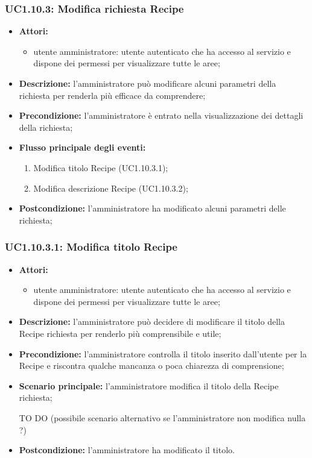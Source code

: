 \subsubsection{UC1.10.3: Modifica richiesta Recipe}
	\begin{itemize}
		\item \textbf{Attori:}
		\begin{itemize}
			\item utente amministratore: utente autenticato che ha accesso al servizio e dispone dei permessi per visualizzare tutte le aree;
		\end{itemize}
		\item \textbf{Descrizione:} l'amministratore può modificare alcuni parametri della richiesta per renderla più efficace da comprendere;
		\item \textbf{Precondizione:} l'amministratore è entrato nella visualizzazione dei dettagli della richiesta;
		\item \textbf{Flusso principale degli eventi:}
		\begin{enumerate}
			\item Modifica titolo Recipe (UC1.10.3.1);
			\item Modifica descrizione Recipe (UC1.10.3.2);
		\end{enumerate}
		\item \textbf{Postcondizione:} l'amministratore ha modificato alcuni parametri delle richiesta;
	\end{itemize}

\subsubsection{UC1.10.3.1: Modifica titolo Recipe}
	\begin{itemize}
		\item \textbf{Attori:}
		\begin{itemize}
			\item utente amministratore: utente autenticato che ha accesso al servizio e dispone dei permessi per visualizzare tutte le aree;
		\end{itemize}
		\item \textbf{Descrizione:} l'amministratore può decidere di modificare il titolo della Recipe richiesta per renderlo più comprensibile e utile;
		\item \textbf{Precondizione:} l'amministratore controlla il titolo inserito dall'utente per la Recipe e riscontra qualche mancanza o poca chiarezza di comprensione;
		\item \textbf{Scenario principale:} l'amministratore modifica il titolo della Recipe richiesta;
		\item [TO DO] (possibile scenario alternativo se l'amministratore non modifica nulla ?)
		\item \textbf{Postcondizione:} l'amministratore ha modificato il titolo.
	\end{itemize}

